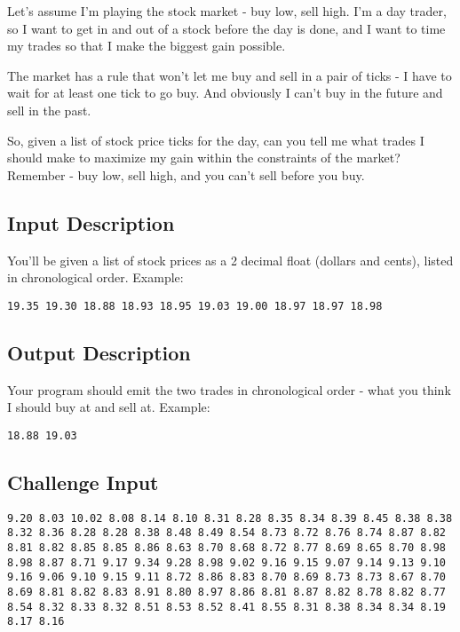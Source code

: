 Let's assume I'm playing the stock market - buy low, sell high. I'm a
day trader, so I want to get in and out of a stock before the day is
done, and I want to time my trades so that I make the biggest gain
possible.

The market has a rule that won't let me buy and sell in a pair of ticks
- I have to wait for at least one tick to go buy. And obviously I can't
buy in the future and sell in the past.

So, given a list of stock price ticks for the day, can you tell me what
trades I should make to maximize my gain within the constraints of the
market? Remember - buy low, sell high, and you can't sell before you
buy.

\subsection*{Input Description}\label{input-description-8}

You'll be given a list of stock prices as a 2 decimal float (dollars and
cents), listed in chronological order. Example:

\begin{lstlisting}
19.35 19.30 18.88 18.93 18.95 19.03 19.00 18.97 18.97 18.98
\end{lstlisting}

\subsection*{Output Description}\label{output-description-8}

Your program should emit the two trades in chronological order - what
you think I should buy at and sell at. Example:

\begin{lstlisting}
18.88 19.03
\end{lstlisting}

\subsection*{Challenge Input}\label{challenge-input-7}

\begin{lstlisting}
9.20 8.03 10.02 8.08 8.14 8.10 8.31 8.28 8.35 8.34 8.39 8.45 8.38 8.38 8.32 8.36 8.28 8.28 8.38 8.48 8.49 8.54 8.73 8.72 8.76 8.74 8.87 8.82 8.81 8.82 8.85 8.85 8.86 8.63 8.70 8.68 8.72 8.77 8.69 8.65 8.70 8.98 8.98 8.87 8.71 9.17 9.34 9.28 8.98 9.02 9.16 9.15 9.07 9.14 9.13 9.10 9.16 9.06 9.10 9.15 9.11 8.72 8.86 8.83 8.70 8.69 8.73 8.73 8.67 8.70 8.69 8.81 8.82 8.83 8.91 8.80 8.97 8.86 8.81 8.87 8.82 8.78 8.82 8.77 8.54 8.32 8.33 8.32 8.51 8.53 8.52 8.41 8.55 8.31 8.38 8.34 8.34 8.19 8.17 8.16
\end{lstlisting}

